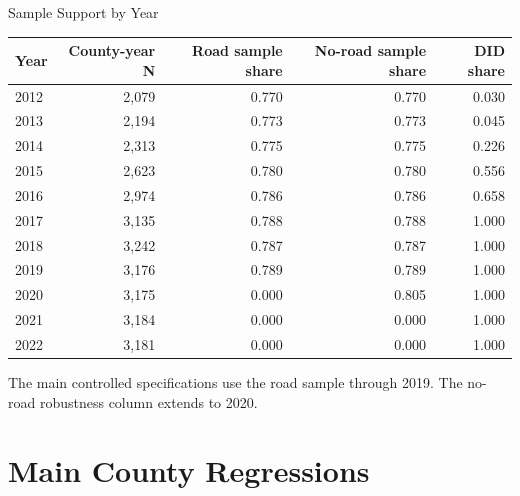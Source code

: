 \documentclass{beamer}
\begin{document}
\begin{frame}{Sample Support by Year}

\centering
\scriptsize
\setlength{\tabcolsep}{6pt}

\begin{tabular}{lrrrr}
\toprule
Year & County-year N & Road sample share & No-road sample share & DID share \\
\midrule
2012 & 2,079 & 0.770 & 0.770 & 0.030 \\
2013 & 2,194 & 0.773 & 0.773 & 0.045 \\
2014 & 2,313 & 0.775 & 0.775 & 0.226 \\
2015 & 2,623 & 0.780 & 0.780 & 0.556 \\
2016 & 2,974 & 0.786 & 0.786 & 0.658 \\
2017 & 3,135 & 0.788 & 0.788 & 1.000 \\
2018 & 3,242 & 0.787 & 0.787 & 1.000 \\
2019 & 3,176 & 0.789 & 0.789 & 1.000 \\
2020 & 3,175 & 0.000 & 0.805 & 1.000 \\
2021 & 3,184 & 0.000 & 0.000 & 1.000 \\
2022 & 3,181 & 0.000 & 0.000 & 1.000 \\
\bottomrule
\end{tabular}

\vspace{0.5em}
\raggedright
\tiny The main controlled specifications use the road sample through 2019. The no-road robustness column extends to 2020.

\end{frame}


\section{Main County Regressions}
\end{document}
